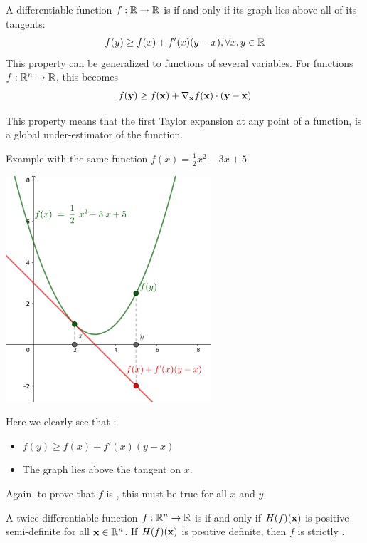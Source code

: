 \begin{proposition}
    \label{convex-property}
    A differentiable function $f: \R \to \R$ is \cvx{} if and only if its graph lies above all of its tangents:
    $$f(y) \geq f(x) + f'(x)(y-x), \forall x,y \in \R$$
    This property can be generalized to functions of several variables. For functions $f: \R^n \to \R$, this becomes
    $$f(\vy) \geq f(\vx) + \nabla_\vx f(\vx) \cdot (\vy - \vx)$$
\end{proposition}

\begin{remark}
    This property means that the first Taylor expansion at any point of a \cvx{} function, is a global under-estimator of the function.
\end{remark}

\begin{example}
    Example with the same function $f(x) = \frac{1}{2}x^2 -3x+5$
    \begin{center}
      \includegraphics[width=3in]{images/Chapter4/convex2.png}
    \end{center}
    Here we clearly see that :
    \begin{itemize}
        \item $f(y) \geq f(x) + f'(x)(y-x)$
        \item The graph lies above the tangent on $x$.
    \end{itemize}
    Again, to prove that $f$ is \cvx, this must be true for all $x$ and $y$.
\end{example}

\begin{theorem}
    \label{theorem-hessian-convex}
    A twice differentiable function $f : \R^n \rightarrow \R$ is \cvx{} if and only if $H(f)(\vx)$ is positive semi-definite for all $\vx \in \R^n$. If $H(f)(\vx)$ is positive definite, then $f$ is strictly \cvx.
\end{theorem}

